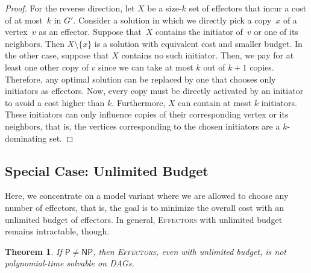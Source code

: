 \documentclass{article}
\newcommand{\np}{{\mathsf{NP}}}
\newcommand{\p}{{\mathsf{P}}}
\newtheorem{theorem}{Theorem}
\newcommand{\probEffectors}{\textsc{Effectors}\xspace}
\begin{document}
\begin{proof}
  For the reverse direction, let $X$ be a size-$k$ set of effectors
  that incur a cost of at most~$k$ in $G'$. Consider a solution in which we directly
  pick a copy~$x$ of a vertex~$v$ as an effector. Suppose that~$X$ contains the initiator of~$v$ or one of its neighbors. 
  Then $X \setminus \{x\}$ is a solution with equivalent cost and smaller budget. In the other case, suppose that $X$ contains no such initiator. Then, we pay for at least
  one other copy of $v$ since we can take at most $k$ out of $k+1$
  copies.
  Therefore, any optimal solution can be replaced by one that chooses
  only initiators as effectors. Now, every copy must be directly
  activated by an initiator to avoid a cost higher than $k$. 
  Furthermore, $X$ can contain at most $k$ initiators. These initiators can 
  only influence copies of their corresponding vertex or its neighbors,  
  that is, the vertices corresponding to the chosen initiators are a
  $k$-dominating set.   
\end{proof}

\subsection{Special Case: Unlimited Budget}\label{section:infiniteBudget}
Here, we concentrate on a model variant where we are allowed to choose any number of effectors,
that is, the goal is to minimize the overall cost with an unlimited budget of effectors.
In general, \probEffectors with unlimited budget remains intractable, though.

\begin{theorem}\label{thm:inftyNP}
  If $\p \neq \np$,
  then \probEffectors, even with unlimited budget, is not
  polynomial-time solvable on DAGs.
\end{theorem}
\end{document}
